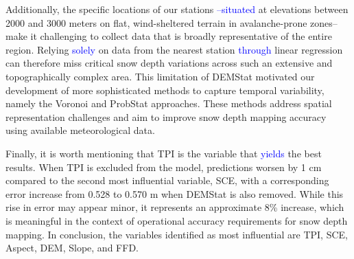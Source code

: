 \documentclass[preprint,12pt]{elsarticle}
\begin{document}
Additionally, the specific locations of our stations \textcolor{blue}{--situated} at elevations between 2000 and 3000 meters on flat, wind-sheltered terrain in avalanche-prone zones-- make it challenging to collect data that is broadly representative of the entire region. Relying \textcolor{blue}{solely} on data from the nearest station \textcolor{blue}{through} linear regression can therefore miss critical snow depth variations across such an extensive and topographically complex area. This limitation of DEMStat motivated our development of more sophisticated methods to capture temporal variability, namely the Voronoi and ProbStat approaches. These methods address spatial representation challenges and aim to improve snow depth mapping accuracy using available meteorological data.

Finally, it is worth mentioning that TPI is the variable that \textcolor{blue}{yields} the best results. When TPI is excluded from the model, predictions worsen by 1 cm compared to the second most influential variable, SCE, with a corresponding error increase from 0.528 to 0.570 m when DEMStat is also removed. While this rise in error may appear minor, it represents an approximate 8\% increase, which is meaningful in the context of operational accuracy requirements for snow depth mapping. In conclusion, the variables identified as most influential are TPI, SCE, Aspect, DEM, Slope, and FFD.
\end{document}

